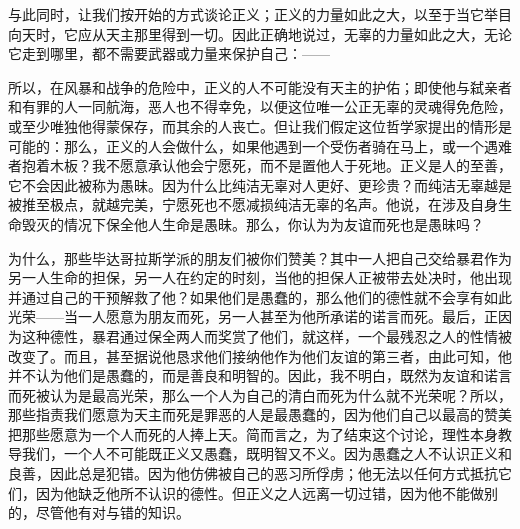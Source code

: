 与此同时，让我们按开始的方式谈论正义；正义的力量如此之大，以至于当它举目向天时，它应从天主那里得到一切。因此正确地说过，无辜的力量如此之大，无论它走到哪里，都不需要武器或力量来保护自己：——\par

\par

所以，在风暴和战争的危险中，正义的人不可能没有天主的护佑；即使他与弑亲者和有罪的人一同航海，恶人也不得幸免，以便这位唯一公正无辜的灵魂得免危险，或至少唯独他得蒙保存，而其余的人丧亡。但让我们假定这位哲学家提出的情形是可能的：那么，正义的人会做什么，如果他遇到一个受伤者骑在马上，或一个遇难者抱着木板？我不愿意承认他会宁愿死，而不是置他人于死地。正义是人的至善，它不会因此被称为愚昧。因为什么比纯洁无辜对人更好、更珍贵？而纯洁无辜越是被推至极点，就越完美，宁愿死也不愿减损纯洁无辜的名声。他说，在涉及自身生命毁灭的情况下保全他人生命是愚昧。那么，你认为为友谊而死也是愚昧吗？\par

为什么，那些毕达哥拉斯学派的朋友们被你们赞美？其中一人把自己交给暴君作为另一人生命的担保，另一人在约定的时刻，当他的担保人正被带去处决时，他出现并通过自己的干预解救了他？如果他们是愚蠢的，那么他们的德性就不会享有如此光荣——当一人愿意为朋友而死，另一人甚至为他所承诺的诺言而死。最后，正因为这种德性，暴君通过保全两人而奖赏了他们，就这样，一个最残忍之人的性情被改变了。而且，甚至据说他恳求他们接纳他作为他们友谊的第三者，由此可知，他并不认为他们是愚蠢的，而是善良和明智的。因此，我不明白，既然为友谊和诺言而死被认为是最高光荣，那么一个人为自己的清白而死为什么就不光荣呢？所以，那些指责我们愿意为天主而死是罪恶的人是最愚蠢的，因为他们自己以最高的赞美把那些愿意为一个人而死的人捧上天。简而言之，为了结束这个讨论，理性本身教导我们，一个人不可能既正义又愚蠢，既明智又不义。因为愚蠢之人不认识正义和良善，因此总是犯错。因为他仿佛被自己的恶习所俘虏；他无法以任何方式抵抗它们，因为他缺乏他所不认识的德性。但正义之人远离一切过错，因为他不能做别的，尽管他有对与错的知识。\par

